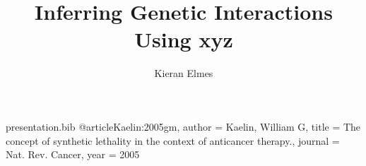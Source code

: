 \begin{filecontents*}{presentation.bib}
@article{Kaelin:2005gm,
	author = {Kaelin, William G},
	title = {{The concept of synthetic lethality in the context of anticancer therapy.}},
	journal = {Nat. Rev. Cancer},
	year = {2005}
}
\end{filecontents*}

\documentclass[8pt]{beamer}

\usepackage[style=numeric,firstinits=true,backend=biber]{biblatex}

\usepackage{todonotes}



\title{Inferring Genetic Interactions Using xyz}
\author{Kieran Elmes}

\begin{frame}[plain]
    \maketitle
\end{frame}

